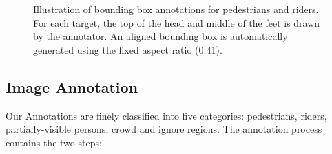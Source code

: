 \documentclass[journal]{IEEEtran}
\begin{document}
\begin{figure}[t]
\centering
{}
\caption{Illustration of bounding box annotations for pedestrians and riders. For each target, the top of the head and middle of the feet is drawn by the annotator. An aligned bounding box is automatically generated using the fixed aspect ratio (0.41).}
\label{fig:examples-bb-annos}
\end{figure}

\subsection{Image Annotation}
Our Annotations are finely classified into five categories: pedestrians, riders, partially-visible persons, crowd and ignore regions. The annotation process contains the two steps:
\end{document}
